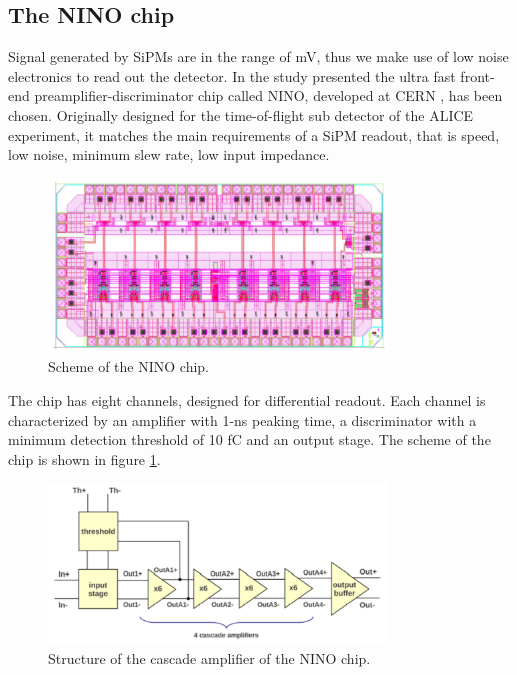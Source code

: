 \subsection{The NINO chip}
Signal generated by SiPMs are in the range of mV, thus we make use of low noise electronics to read out the detector. In the study presented the ultra fast front-end preamplifier-discriminator chip called NINO, developed at CERN \cite{Anghinolfi2004}, has been chosen. Originally designed for the time-of-flight sub detector of the ALICE experiment, it matches the main requirements of a SiPM readout, that is speed, low noise, minimum slew rate, low input impedance.
\begin{figure}[htbp]
\begin{center}
\includegraphics[width=9cm]{Pictures/Chapter_3/NINO.pdf}
\end{center}
\caption[Scheme of the NINO chip]{Scheme of the NINO chip.}
\label{fig:nino_foto}
\end{figure}

The chip has eight channels, designed for differential readout. Each channel is characterized by an amplifier with 1-ns peaking time, a discriminator with a minimum detection threshold of 10 fC and an output stage. The scheme of the chip is shown in figure \ref{fig:nino_foto}.
\begin{figure}[htbp]
\begin{center}
\includegraphics[width=9cm]{Pictures/Chapter_3/NINO_scheme.pdf}\end{center}
\caption[Cascade amplifier of the NINO chip]{Structure of the cascade amplifier of the NINO chip.}
\label{fig:nino_scheme}
\end{figure}

